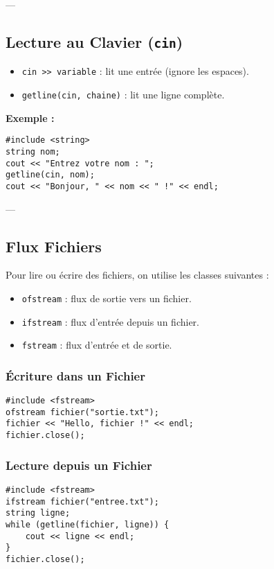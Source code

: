 ---

\subsection{ Lecture au Clavier (\texttt{cin})}
\begin{itemize}
    \item \texttt{cin >> variable} : lit une entrée (ignore les espaces).
    \item \texttt{getline(cin, chaine)} : lit une ligne complète.
\end{itemize}

\textbf{Exemple :}
\begin{tcolorbox}[colframe=blue!50!black, colback=blue!5!white, title=Exemple de Lecture au Clavier]
\begin{verbatim}
#include <string>
string nom;
cout << "Entrez votre nom : ";
getline(cin, nom);
cout << "Bonjour, " << nom << " !" << endl;
\end{verbatim}
\end{tcolorbox}

---

\subsection{ Flux Fichiers}
Pour lire ou écrire des fichiers, on utilise les classes suivantes :
\begin{itemize}
    \item \texttt{ofstream} : flux de sortie vers un fichier.
    \item \texttt{ifstream} : flux d'entrée depuis un fichier.
    \item \texttt{fstream} : flux d'entrée et de sortie.
\end{itemize}

\subsubsection{ Écriture dans un Fichier}
\begin{tcolorbox}[colframe=blue!50!black, colback=blue!5!white, title=Exemple d'Écriture dans un Fichier]
\begin{verbatim}
#include <fstream>
ofstream fichier("sortie.txt");
fichier << "Hello, fichier !" << endl;
fichier.close();
\end{verbatim}
\end{tcolorbox}

\subsubsection{ Lecture depuis un Fichier}
\begin{tcolorbox}[colframe=blue!50!black, colback=blue!5!white, title=Exemple de Lecture depuis un Fichier]
\begin{verbatim}
#include <fstream>
ifstream fichier("entree.txt");
string ligne;
while (getline(fichier, ligne)) {
    cout << ligne << endl;
}
fichier.close();
\end{verbatim}
\end{tcolorbox}

